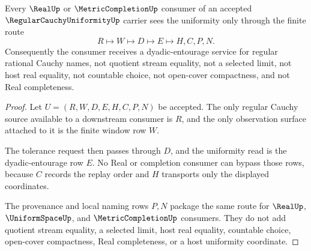 \begin{theorem}
\label{thm:regular-cauchy-uniformity-real-seal-handoff}
Every $\RealUp$ or $\MetricCompletionUp$ consumer of an accepted $\RegularCauchyUniformityUp$ carrier sees the uniformity only through the finite route
$$
R \longmapsto W \longmapsto D \longmapsto E \longmapsto H,C,P,N .
$$
Consequently the consumer receives a dyadic-entourage service for regular rational Cauchy names, not quotient stream equality, not a selected limit, not host real equality, not countable choice, not open-cover compactness, and not Real completeness.
\end{theorem}
\begin{proof}
Let $U=(R,W,D,E,H,C,P,N)$ be accepted. The only regular Cauchy source available to a downstream consumer is $R$, and the only observation surface attached to it is the finite window row $W$.

The tolerance request then passes through $D$, and the uniformity read is the dyadic-entourage row $E$. No Real or completion consumer can bypass those rows, because $C$ records the replay order and $H$ transports only the displayed coordinates.

The provenance and local naming rows $P,N$ package the same route for $\RealUp$, $\UniformSpaceUp$, and $\MetricCompletionUp$ consumers. They do not add quotient stream equality, a selected limit, host real equality, countable choice, open-cover compactness, Real completeness, or a host uniformity coordinate.
\end{proof}

